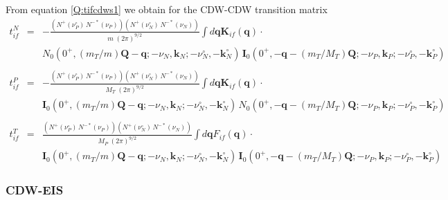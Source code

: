 From equation \ref{Q:tifcdws1} we obtain for the CDW-CDW transition
matrix
\begin{eqnarray}\label{Q:tn_if}
t^{N}_{if}&=& -\frac{\left( N^{+}(\nu_{P}^{\circ})\,N^{-*}(\nu_{P}) \right)
\left( N^{+}(\nu_{N}^{\circ})\,N^{-*}(\nu_{N}) \right)}{m \; (2 \pi)^{9/2}}
\int d \bm{q} \bm{K}_{if}(\bm{q}) \cdot
  \\
&& N_{0}(0^{+}, (m_{T}/m)\bm{Q} - \bm{q}; -\nu_{N}, \bm{k}_{N};
-\nu_{N}^{\circ}, -\bm{k}_{N}^{\circ} ) \, \bm{I}_{0}( 0^{+} ,
-\bm{q}-(m_{T}/M_{T})\bm{Q};-\nu_{P},\bm{k}_{P}; -\nu_{P}^{\circ},
-\bm{k}_{P}^{\circ}) \nonumber
\\
\nonumber \\
t^{P}_{if}&=& -\frac{\left( N^{+}(\nu_{P}^{\circ})\,N^{-*}(\nu_{P}) \right)
\left( N^{+}(\nu_{N}^{\circ})\,N^{-*}(\nu_{N}) \right)}{M_{T} \; (2
\pi)^{9/2}} \int d \bm{q} \bm{K}_{if}(\bm{q}) \cdot
  \\
&& \bm{I}_{0}(0^{+}, (m_{T}/m)\bm{Q} - \bm{q}; -\nu_{N}, \bm{k}_{N} ;
-\nu_{N}^{\circ}, -\bm{k}_{N}^{\circ}) \, N_{0}( 0^{+} ,
-\bm{q}-(m_{T}/M_{T})\bm{Q};-\nu_{P},\bm{k}_{P}; -\nu_{P}^{\circ},
-\bm{k}_{P}^{\circ}) \nonumber
\\
\nonumber \\
t^{T}_{if}&=& \frac{\left( N^{+}(\nu_{P}^{\circ})\,N^{-*}(\nu_{P}) \right)
\left( N^{+}(\nu_{N}^{\circ})\,N^{-*}(\nu_{N}) \right)}{M_{P} \; (2
\pi)^{9/2}} \int d \bm{q} F_{if}(\bm{q}) \cdot
  \\
&& \bm{I}_{0}(0^{+}, (m_{T}/m)\bm{Q} - \bm{q}; -\nu_{N}, \bm{k}_{N};
-\nu_{N}^{\circ}, -\bm{k}_{N}^{\circ} ) \, \bm{I}_{0}( 0^{+} , -\bm{q} -
(m_{T}/M_{T})\bm{Q} ; - \nu_{P}, \bm{k}_{P}; -\nu_{P}^{\circ}, - \bm{k}_{P}^{\circ} )
\nonumber
\end{eqnarray}

\subsubsection{CDW-EIS}

